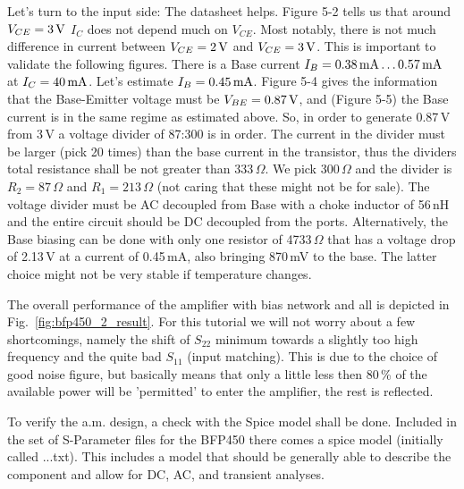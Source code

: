 Let's turn to the input side: The datasheet helps. Figure 5-2 tells us
that around $V_{CE}=3\,\mathrm{V}$ $I_C$ does not depend much on
$V_{CE}$. Most notably, there is not much difference in current
between $V_{CE}=2\,\mathrm{V}$ and $V_{CE}=3\,\mathrm{V}$. This is
important to validate the following figures. There is a Base current
$I_B=0.38\,\mathrm{mA}\ldots0.57\,\mathrm{mA}$ at
$I_C=40\,\mathrm{mA}$. Let's estimate $I_B=0.45\,\mathrm{mA}$. Figure 5-4
gives the information that the Base-Emitter voltage must be
$V_{BE}=0.87\,\mathrm{V}$, and (Figure 5-5) the Base current is in the
same regime as estimated above. So, in order to generate 0.87\,V from
3\,V a voltage divider of 87:300 is in order. The current in the
divider must be larger (pick 20 times) than the base current in the
transistor, thus the dividers total resistance shall be not greater
than 333\,$\Omega$. We pick 300\,$\Omega$ and the divider is
$R_2=87\,\Omega$ and $R_1=213\,\Omega$ (not caring that these might
not be for sale). The voltage divider must be AC decoupled from Base
with a choke inductor of 56\,nH and the entire circuit should be DC
decoupled from the ports. Alternatively, the Base biasing can be done
with only one resistor of 4733\,$\Omega$ that has a voltage drop of
2.13\,V at a current of 0.45\,mA, also bringing 870\,mV to the
base. The latter choice might not be very stable if temperature
changes.

The overall performance of the amplifier with bias network and all is
depicted in Fig.~\ref{fig:bfp450_2_result}. For this tutorial we will
not worry about a few shortcomings, namely the shift of $S_{22}$
minimum towards a slightly too high frequency and the quite bad $S_{11}$
(input matching). This is due to the choice of good noise figure, but
basically means that only a little less then 80\,\% of the available
power will be 'permitted' to enter the amplifier, the rest is reflected.


To verify the a.m. design, a check with the Spice model shall be
done. Included in the set of S-Parameter files for the BFP450 there
comes a spice model (initially called ...txt). This includes a model
that should be generally able to describe the component and allow for
DC, AC, and transient analyses. 

